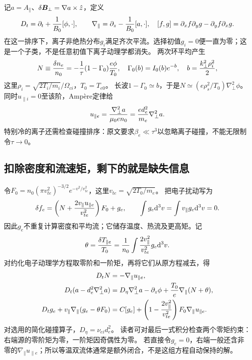 \documentclass[UTF8,a4paper,11pt,openany,fontset=fandol]{ctexbook}
\begin{document}
记$a=A_\parallel$、$\delta\bm{B}_\perp=\nabla a\times\hat z$，定义
\begin{equation}
 D_t=\partial_t+{1\over B_0}[\phi,\cdot],\qquad
 \nabla_\parallel=\partial_z-{1\over B_0}[a,\cdot],\quad
 [f,g]=\partial_xf\partial_yg-\partial_yf\partial_xg.
\end{equation}
在这一排序下，离子非绝热分布$g_i$满足齐次平流。选择初值$g_i=0$便一直为零；这是一个子类，不是任意初值下离子动理学都消失。
两次环平均产生
\begin{equation}
 N\equiv{\delta n_e\over n_0}=-{1\over\tau}(1-\Gamma_0){e\phi\over T_0},\quad
 \Gamma_0(b)=I_0(b)e^{-b},\quad b={k_\perp^2\rho_i^2\over2},
 \label{eq:selected-quasi}
\end{equation}
这里$\rho_i=\sqrt{2T_i/m_i}/\Omega_{ci}$，$T_0=T_{e0}$。
长波$1-\Gamma_0\simeq b$，于是$N\simeq(e\rho_s^2/T_0)\nabla_\perp^2\phi$。
同时$u_{\parallel i}=0$至该阶，Ampère定律给
\begin{equation}
 u_{\parallel e}={\nabla_\perp^2a\over\mu_0en_0}
 ={e d_e^2\over m_e}\nabla_\perp^2a.
\end{equation}
特别冷的离子还需检查碰撞排序：原文要求$\beta_e\ll\tau^3$以忽略离子碰撞，不能无限制令$\tau\to0$。

\subsection{扣除密度和流速矩，剩下的就是缺失信息}
令$F_0=n_0(\pi v_{te}^2)^{-3/2}e^{-v^2/v_{te}^2}$，这里$v_{te}=\sqrt{2T_0/m_e}$。
把电子扰动写为
\begin{equation}
 \delta f_e=\left(N+{2v_\parallel u_{\parallel e}\over v_{te}^2}\right)F_0+g_e,
 \qquad\int g_e\mathrm d^3v=\int v_\parallel g_e\mathrm d^3v=0.
\end{equation}
因此$g_e$不重复计算密度和平均流；它储存温度、热流及更高矩。记
\begin{equation}
 \theta={\delta T_{\parallel e}\over T_0}
 ={1\over n_0}\int{2v_\parallel^2\over v_{te}^2}g_e\mathrm d^3v.
\end{equation}
对约化电子动理学方程取零阶和一阶矩，再将它们从原方程减去，得
\begin{align}
 D_tN&=-\nabla_\parallel u_{\parallel e},\label{eq:selected-krehn}\\
 D_t(a-d_e^2\nabla_\perp^2a)&=D_\eta\nabla_\perp^2a-\partial_z\phi
 +{T_0\over e}\nabla_\parallel(N+\theta),\label{eq:selected-kreha}\\
 D_tg_e+v_\parallel\nabla_\parallel(g_e-\theta F_0)
 &=C[g_e]+\left(1-{2v_\parallel^2\over v_{te}^2}\right)
 F_0\nabla_\parallel u_{\parallel e}.\label{eq:selected-krehg}
\end{align}
对选用的简化碰撞算子，$D_\eta=\nu_{ei}d_e^2$。
读者可对最后一式积分检查两个零矩约束：右端源的零阶矩为零，一阶矩因奇偶性为零。
若直接令$g_e=0$，右端一般还含非零的$\nabla_\parallel u_{\parallel e}$；所以等温双流体通常是额外闭合，不是这组方程自动保持的解。
\end{document}
